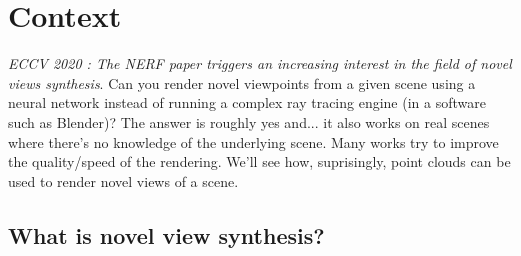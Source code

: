 \section{Context}
\label{sec:Context}

\textit{ECCV 2020 : The NERF \cite{mildenhall2020nerf} paper triggers an increasing interest in the field of novel views synthesis}. Can you render novel viewpoints from a given scene using a neural network instead of running a complex ray tracing engine (in a software such as Blender)? The answer is roughly yes and... it also works on real scenes where there's no knowledge of the underlying scene. Many works try to improve the quality/speed of the rendering. We'll see how, suprisingly, point clouds can be used to render novel views of a scene.


\subsection{What is novel view synthesis?}
\label{sec:novel_view_synthesis}


